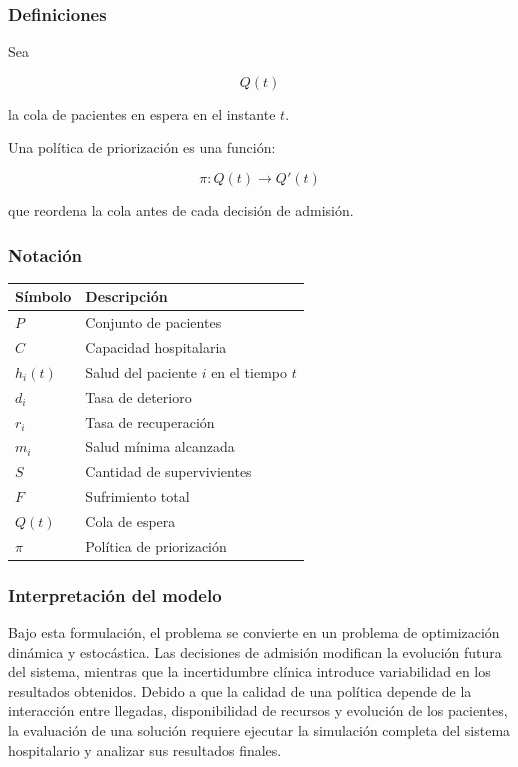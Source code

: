 \documentclass[12pt,a4paper]{article}
\begin{document}
\subsubsection{Definiciones}

Sea

\[
Q(t)
\]

la cola de pacientes en espera en el instante \(t\).

Una política de priorización es una función:

\[
\pi :
Q(t)
\rightarrow
Q'(t)
\]

que reordena la cola antes de cada decisión de admisión.

\subsubsection{Notación}

\begin{center}
\begin{tabular}{ll}
\toprule
Símbolo & Descripción \\
\midrule
\(P\) & Conjunto de pacientes \\
\(C\) & Capacidad hospitalaria \\
\(h_i(t)\) & Salud del paciente \(i\) en el tiempo \(t\) \\
\(d_i\) & Tasa de deterioro \\
\(r_i\) & Tasa de recuperación \\
\(m_i\) & Salud mínima alcanzada \\
\(S\) & Cantidad de supervivientes \\
\(F\) & Sufrimiento total \\
\(Q(t)\) & Cola de espera \\
\(\pi\) & Política de priorización \\
\bottomrule
\end{tabular}
\end{center}

\subsubsection{Interpretación del modelo}

Bajo esta formulación, el problema se convierte en un problema de optimización dinámica y estocástica. Las decisiones de admisión modifican la evolución futura del sistema, mientras que la incertidumbre clínica introduce variabilidad en los resultados obtenidos. Debido a que la calidad de una política depende de la interacción entre llegadas, disponibilidad de recursos y evolución de los pacientes, la evaluación de una solución requiere ejecutar la simulación completa del sistema hospitalario y analizar sus resultados finales.
\end{document}

